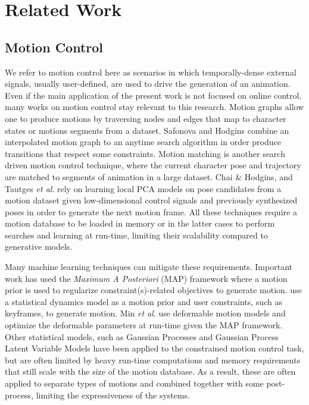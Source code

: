 \documentclass[acmtog]{acmart}
\newcommand{\etal}{\textit{et al}. }
\begin{document}
\section{Related Work}
\subsection{Motion Control}
We refer to motion control here as scenarios in which temporally-dense external signals, usually user-defined, are used to drive the generation of an animation. Even if the main application of the present work is not focused on online control, many works on motion control stay relevant to this research. Motion graphs \cite{arikan2002interactive, lee2002interactive, beaudoin2008motion, kovar2008motion} allow one to produce motions by traversing nodes and edges that map to character states or motions segments from a dataset. Safonova and Hodgins \cite{safonova2007construction} combine an interpolated motion graph to an anytime  search algorithm in order produce transitions that respect some constraints. Motion matching \cite{ButtnerNuclai} is another search driven motion control technique, where the current character pose and trajectory are matched to segments of animation in a large dataset. Chai \& Hodgins, and Tautges \etal {} rely on learning local PCA models on pose candidates from a motion dataset given low-dimensional control signals and previously synthesized poses in order to generate the next motion frame. All these techniques require a motion database to be loaded in memory or in the latter cases to perform searches and learning at run-time, limiting their scalability compared to generative models.

 Many machine learning techniques can mitigate these requirements. Important work has used the \textit{Maximum A Posteriori} (MAP) framework where a motion prior is used to regularize constraint(s)-related objectives to generate motion. \cite{chai2007constraint} use a statistical dynamics model as a motion prior and user constraints, such as keyframes, to generate motion. Min \etal {} use deformable motion models and optimize the deformable parameters at run-time given the MAP framework. Other statistical models, such as Gaussian Processes \cite{min2012motion} and Gaussian Process Latent Variable Models \cite{grochow2004style, levine2012continuous, wang2008gaussian, ye2010synthesis} have been applied to the constrained motion control task, but are often limited by heavy run-time computations and memory requirements that still scale with the size of the motion database. As a result, these are often applied to separate types of motions and combined together with some post-process, limiting the expressiveness of the systems.
\end{document}
